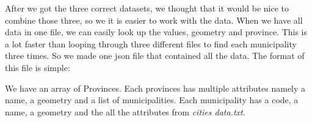 		After we got the three correct datasets, we thought that it would be nice to combine those three, so we it is easier to work with the data.
		When we have all data in one file, we can easily look up the values, geometry and province.
		This is a lot faster than looping through three different files to find each municipality three times.
		So we made one json file that contained all the data. The format of this file is simple:

		We have an array of Provinces.
		Each provinces has multiple attributes namely a name, a geometry and a list of municipalities.
		Each municipality has a code, a name, a geometry and the all the attributes from \emph{cities data.txt}.
